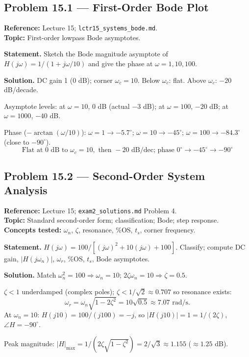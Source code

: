 \documentclass[11pt]{article}
\begin{document}
\subsection{Problem 15.1 --- First-Order Bode Plot}
\textbf{Reference:} Lecture 15; \texttt{lctr15\_systems\_bode.md}.\\
\textbf{Topic:} First-order lowpass Bode asymptotes.

\textbf{Statement.} Sketch the Bode magnitude asymptote of $H(j\omega) = 1/(1+j\omega/10)$ and give the phase at $\omega=1,10,100$.

\textbf{Solution.}
DC gain 1 (0 dB); corner $\omega_c = 10$. Below $\omega_c$: flat. Above $\omega_c$: $-20$ dB/decade.

Asymptote levels: at $\omega = 10$, 0 dB (actual $-3$ dB); at $\omega=100$, $-20$ dB; at $\omega=1000$, $-40$ dB.

Phase ($-\arctan(\omega/10)$): $\omega=1 \to -5.7^\circ$; $\omega=10\to -45^\circ$; $\omega=100\to -84.3^\circ$ (close to $-90^\circ$).
\[
\boxed{\,\text{Flat at 0 dB to }\omega_c=10,\text{ then }-20\text{ dB/dec; phase }0^\circ\to -45^\circ\to -90^\circ\,}
\]

\subsection{Problem 15.2 --- Second-Order System Analysis}
\textbf{Reference:} Lecture 15; \texttt{exam2\_solutions.md} Problem 4.\\
\textbf{Topic:} Standard second-order form; classification; Bode; step response.\\
\textbf{Concepts tested:} $\omega_n$, $\zeta$, resonance, \%OS, $t_s$, corner frequency.

\textbf{Statement.} $H(j\omega) = 100/[(j\omega)^2 + 10(j\omega) + 100]$. Classify; compute DC gain, $|H(j\omega_n)|$, $\omega_r$, \%OS, $t_s$, Bode asymptotes.

\textbf{Solution.}
Match $\omega_n^2 = 100\Rightarrow \omega_n = 10$; $2\zeta\omega_n = 10\Rightarrow \zeta = 0.5$.

$\zeta<1$ underdamped (complex poles); $\zeta<1/\sqrt{2}\approx 0.707$ so resonance exists:
\[
\omega_r = \omega_n\sqrt{1-2\zeta^2} = 10\sqrt{0.5}\approx 7.07\text{ rad/s}.
\]
At $\omega_n=10$: $H(j10) = 100/(j100) = -j$, so $|H(j10)|=1 = 1/(2\zeta)$, $\angle H = -90^\circ$.

Peak magnitude: $|H|_\mathrm{max} = 1/(2\zeta\sqrt{1-\zeta^2}) = 2/\sqrt{3}\approx 1.155$ ($\approx 1.25$ dB).
\end{document}
